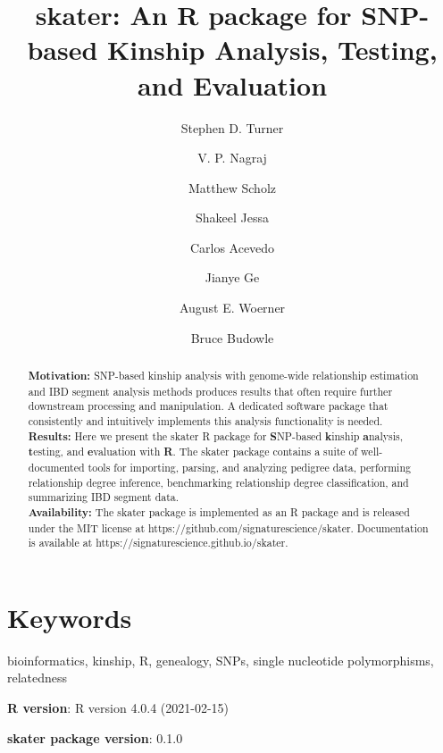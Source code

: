 \documentclass[9pt,a4paper,]{extarticle}
\begin{document}
\pagestyle{front}

\title{\textbf{skater}: An R package for SNP-based Kinship Analysis, Testing, and Evaluation}

\author[1]{Stephen D. Turner}
\author[1]{V. P. Nagraj}
\author[1]{Matthew Scholz}
\author[1]{Shakeel Jessa}
\author[1]{Carlos Acevedo}
\author[2]{Jianye Ge}
\author[2]{August E. Woerner}
\author[2]{Bruce Budowle}

\maketitle
\thispagestyle{front}

\begin{abstract}
\hfill\break
\textbf{Motivation:} SNP-based kinship analysis with genome-wide relationship estimation and IBD segment analysis methods produces results that often require further downstream processing and manipulation. A dedicated software package that consistently and intuitively implements this analysis functionality is needed.\\
\textbf{Results:} Here we present the skater R package for \textbf{S}NP-based \textbf{k}inship \textbf{a}nalysis, \textbf{t}esting, and \textbf{e}valuation with \textbf{R}. The skater package contains a suite of well-documented tools for importing, parsing, and analyzing pedigree data, performing relationship degree inference, benchmarking relationship degree classification, and summarizing IBD segment data.\\
\textbf{Availability:} The skater package is implemented as an R package and is released under the MIT license at https://github.com/signaturescience/skater. Documentation is available at https://signaturescience.github.io/skater.
\end{abstract}

\section*{Keywords}
bioinformatics, kinship, R, genealogy, SNPs, single nucleotide polymorphisms, relatedness


\clearpage
\pagestyle{main}

\textbf{R version}: R version 4.0.4 (2021-02-15)

\textbf{skater package version}: 0.1.0
\end{document}
